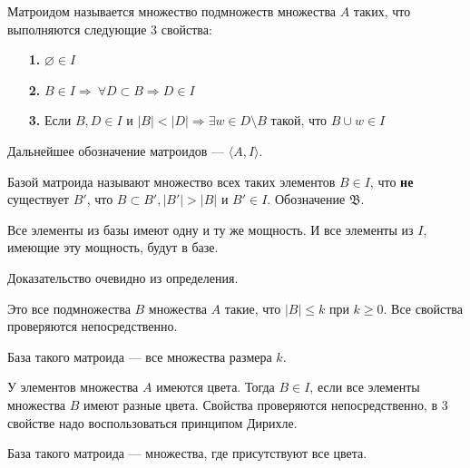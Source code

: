 \documentclass[a4paper, 12pt]{article}
\begin{document}
Матроидом называется множество подмножеств множества $A$ таких, что выполняются 
следующие 3 свойства:
\begin{itemize}
  \item[{\bf 1.}] $\varnothing \in I$

  \item[{\bf 2.}] $B \in I \Rightarrow \ \forall D \subset B \Rightarrow D \in I$

  \item[{\bf 3.}] Если $B, D \in I$ и $|B| < |D| \Rightarrow \exists w \in D 
  \setminus B$ такой, что $B \cup w \in I$ 
\end{itemize}

Дальнейшее обозначение матроидов --- $\langle A, I\rangle$.

\begin{Def}
  Базой матроида называют множество всех таких элементов $B \in I$, что {\bf не}
   существует $B'$, что $B \subset B', |B'|>|B|$ и $B' \in I$. Обозначение $\mathfrak{B}$.
\end{Def}

\begin{Properties}
  Все элементы из базы имеют одну и ту же мощность. И все элементы из $I$, имеющие
  эту мощность, будут в базе.

  Доказательство очевидно из определения.
\end{Properties}

\begin{Examples}
  Это все подмножества $B$ множества $A$ такие, что
  $|B| \leqslant k$ при $k \geqslant 0$. Все свойства проверяются
  непосредственно. 

  База такого матроида --- все множества 
  размера $k$.
\end{Examples}

\begin{Examples}
  У элементов множества $A$ имеются цвета. Тогда $B \in I$, 
  если все элементы множества $B$ имеют разные цвета. 
  Свойства проверяются непосредственно, в 3 свойстве надо воспользоваться
  принципом Дирихле.

  База такого матроида --- множества, где присутствуют все цвета.
\end{Examples}
\end{document}
